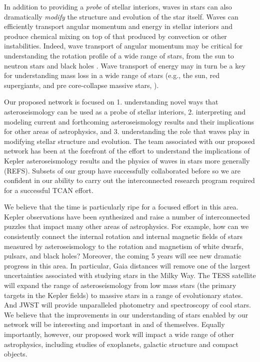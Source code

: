 In addition to providing a {\em probe} of stellar interiors, waves in stars can also dramatically {\em modify} the structure and evolution of the star itself.   Waves can efficiently transport angular momentum and energy in stellar interiors and produce chemical mixing on top of that produced by convection or other instabilities.   Indeed, wave transport of angular momentum may be critical for understanding the rotation profile of a wide range of stars, from the sun to neutron stars and black holes \citep{fullerwave:14,fullerwave:15}.  Wave transport of energy may in turn be a key for understanding mass loss in a wide range of stars (e.g., the sun, red supergiants, and pre core-collapse massive stars, \citealt{quataert:12,fuller:17}).   

Our proposed network is focused on 1.  understanding novel ways that asteroseismology can be used as a probe of stellar interiors, 2. interpreting and modeling current and forthcoming asteroseismology results and their implications for other areas of astrophysics, and 3.  understanding the role that waves play in modifying stellar structure and evolution.  The team associated with our proposed network has been at the forefront of the effort to understand the implications of Kepler asteroseismology results and the physics of waves in stars more generally (REFS).  Subsets of our group have successfully collaborated before so we are confident in our ability to carry out the interconnected research program required for a successful TCAN effort.   

We believe that the time is particularly ripe for a focused effort in this area.  Kepler observations have been synthesized and raise a number of interconnected puzzles that impact many other areas of astrophysics.  For example, how can we consistently connect the internal rotation and internal magnetic fields of stars measured by asteroseismology to the rotation and magnetism of white dwarfs, pulsars, and black holes?  Moreover, the coming 5 years will see new dramatic progress in this area. In particular, Gaia distances will remove one of the largest uncertainties associated with studying stars in the Milky Way.  The TESS satellite will expand the range of asteroseismology from low mass stars (the primary targets in the Kepler fields) to massive stars in a range of evolutionary states.   And JWST will provide unparalleled photometry and spectroscopy of cool stars.    We believe that the improvements in our understanding of stars enabled by our network will be interesting and important in and of themselves.  Equally importantly, however, our proposed work will impact a wide range of other astrophysics, including studies of exoplanets, galactic structure and compact objects.   


